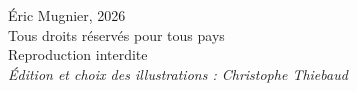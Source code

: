 \thispagestyle{empty}
\vspace*{\fill}
{\footnotesize\noindent
    \textcopyright{} Éric Mugnier, 2026\\
    Tous droits réservés pour tous pays\\
    Reproduction interdite\\
    \textit{Édition et choix des illustrations : Christophe Thiebaud}
}
\cleardoublepage
